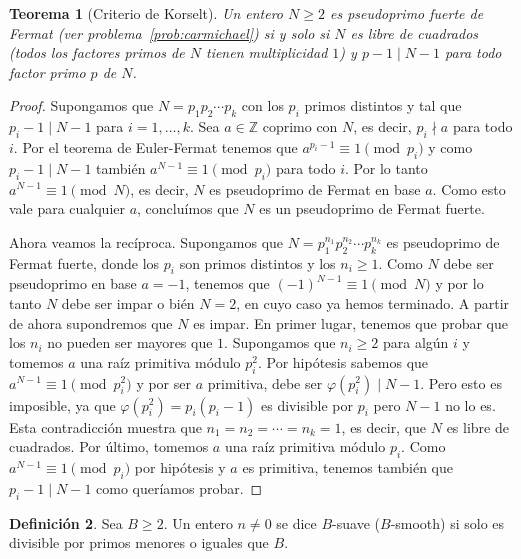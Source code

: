 \documentclass[a4paper, 11pt]{article}
\newcommand{\ZZ}{\mathbb{Z}}
\newcounter{numerodetema}
\theoremstyle{plain}
\newtheorem{teor}{Teorema}[numerodetema]
\theoremstyle{definition}
\newtheorem{defi}[teor]{Definición}
\begin{document}
\begin{teor}[Criterio de Korselt]\label{teor-korselt}
Un entero $N\geq 2$ es pseudoprimo fuerte de Fermat (ver
problema~\ref{prob:carmichael}) si y solo si $N$ es libre de cuadrados (todos
los factores primos de $N$ tienen multiplicidad $1$) y $p-1\mid N-1$ para todo
factor primo $p$ de $N$.
\end{teor}
\begin{proof}
Supongamos que $N=p_1p_2\cdots p_k$ con los $p_i$ primos distintos y tal que
$p_i-1\mid N-1$ para $i=1,\ldots,k$. Sea $a\in\ZZ$ coprimo con $N$, es decir,
$p_i\nmid a$ para todo $i$. Por el teorema de Euler-Fermat tenemos que
$a^{p_i-1}\equiv 1\pmod{p_i}$ y como $p_i-1\mid N-1$ también
$a^{N-1}\equiv1\pmod{p_i}$ para todo $i$. Por lo tanto $a^{N-1}\equiv1\pmod{N}$,
es decir, $N$ es pseudoprimo de Fermat en base $a$. Como esto vale para cualquier
$a$, concluímos que $N$ es un pseudoprimo de Fermat fuerte.

Ahora veamos la recíproca. Supongamos que $N=p_1^{n_1}p_2^{n_2}\cdots p_k^{n_k}$
es pseudoprimo de Fermat fuerte, donde los $p_i$ son primos distintos y los
$n_i\geq 1$. Como $N$ debe ser pseudoprimo en base $a=-1$, tenemos que
$(-1)^{N-1}\equiv1\pmod{N}$ y por lo tanto $N$ debe ser impar o bién $N=2$, en
cuyo caso ya hemos terminado. A partir de ahora supondremos que $N$ es impar.
En primer lugar, tenemos que probar que los $n_i$ no pueden ser mayores que $1$.
Supongamos que $n_i\geq 2$ para algún $i$ y tomemos $a$ una raíz primitiva módulo
$p_i^2$. Por hipótesis sabemos que $a^{N-1}\equiv1\pmod{p_i^2}$ y por ser
$a$ primitiva, debe ser $\varphi(p_i^2)\mid N-1$. Pero esto es imposible, ya
que $\varphi(p_i^2)=p_i(p_i-1)$ es divisible por $p_i$ pero $N-1$ no lo es. Esta
contradicción muestra que $n_1=n_2=\cdots=n_k=1$, es decir, que $N$ es libre de 
cuadrados. Por último, tomemos $a$ una raíz primitiva módulo $p_i$. Como
$a^{N-1}\equiv 1\pmod{p_i}$ por hipótesis y $a$ es primitiva, tenemos también
que $p_i-1\mid N-1$ como queríamos probar.
\end{proof}

\begin{defi}\label{def:suave}
Sea $B\geq 2$. Un entero $n\neq0$ se dice $B$-suave ($B$-smooth) si solo
es divisible por primos menores o iguales que $B$.
\end{defi}

\bigskip
\end{document}

